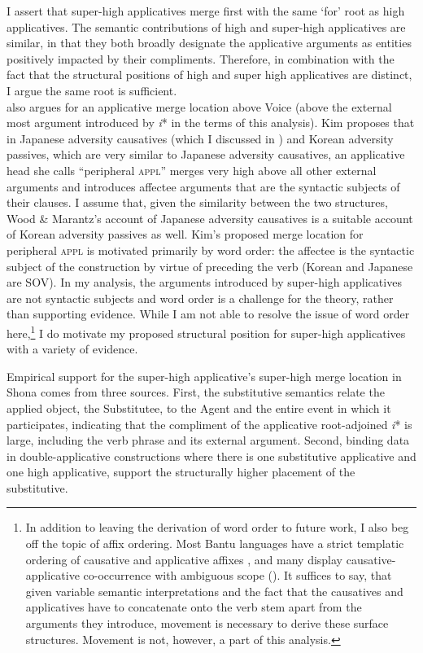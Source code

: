 \documentclass[output=paper,modfonts,nonflat,colorlinks,citecolor=brown]{langsci/langscibook}
\begin{document}
I assert that super-high applicatives merge first with the same ‘for’ root as high applicatives. The semantic contributions of high and super-high applicatives are similar, in that they both broadly designate the applicative arguments as entities positively impacted by their compliments. Therefore, in combination with the fact that the structural positions of high and super high applicatives are distinct, I argue the same root is sufficient.\\

\citet{Kim2011thesis,Kim2012heads} also argues for an applicative merge location above Voice (above the external most argument introduced by \textit{i}* in the terms of this analysis). Kim proposes that in Japanese adversity causatives (which I discussed in ) and Korean adversity passives, which are very similar to Japanese adversity causatives, an applicative head she calls “peripheral \textsc{appl}” merges very high above all other external arguments and introduces affectee arguments that are the syntactic subjects of their clauses. I assume that, given the similarity between the two structures, Wood \& Marantz’s account of Japanese adversity causatives is a suitable account of Korean adversity passives as well. Kim’s proposed merge location for peripheral \textsc{appl} is motivated primarily by word order: the affectee is the syntactic subject of the construction by virtue of preceding the verb (Korean and Japanese are SOV). In my analysis, the arguments introduced by super-high applicatives are not syntactic subjects and word order is a challenge for the theory, rather than supporting evidence. While I am not able to resolve the issue of word order here,\footnote{In addition to leaving the derivation of word order to future work, I also beg off the topic of affix ordering. Most Bantu languages have a strict templatic ordering of causative and applicative affixes \citep{Good2005}, and many display causative-applicative co-occurrence with ambiguous scope (\citealt{Baker1985,Hyman2002}). It suffices to say, that given variable semantic interpretations and the fact that the causatives and applicatives have to concatenate onto the verb stem apart from the arguments they introduce, movement is necessary to derive these surface structures. Movement is not, however, a part of this analysis.}  I do motivate my proposed structural position for super-high applicatives with a variety of evidence.



Empirical support for the super-high applicative’s super-high merge location in Shona comes from three sources. First, the substitutive semantics relate the applied object, the Substitutee, to the Agent and the entire event in which it participates, indicating that the compliment of the applicative root-adjoined \textit{i}* is large, including the verb phrase and its external argument.  Second, binding data in double-applicative constructions where there is one substitutive applicative and one high applicative, support the structurally higher placement of the substitutive.
\end{document}
